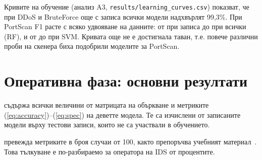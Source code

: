 Кривите на обучение (анализ A3, \texttt{results/learning\_curves.csv}) показват, че при DDoS и BruteForce още с  записа всички модели надхвърлят 99,3\%. При PortScan F1 расте с всяко удвояване на данните: от  при  записа до  при всички  (RF), и от  до  при SVM. Кривата още не е достигнала таван, т.е. повече различни проби на скенера биха подобрили моделите за PortScan.

\section{Оперативна фаза: основни резултати}\label{sec:r-op}

 съдържа всички величини от матрицата на объркване и метриките (\ref{eq:accuracy})--(\ref{eq:spec}) на деветте модела. Те са изчислени от записаните модели върху тестови записи, които не са участвали в обучението.

\begin{table}[H]
\centering\small
\caption{Основни резултати в оперативната фаза}\label{tab:main}

\vspace{2pt}
\end{table}

 превежда метриките в броя случаи от 100, както препоръчва учебният материал~\cite{borovska2022}. Това тълкуване е по-разбираемо за оператора на IDS от процентите.

\begin{table}[H]
\centering\scriptsize
\caption{Тълкуване на метриките „на 100 случая“}\label{tab:per100}

\vspace{2pt}
\end{table}

